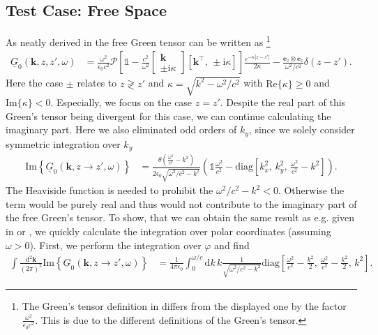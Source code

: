 \documentclass[11pt]{article}
\newcommand{\vv}[1]{\mathbf{#1}}
\newcommand{\ii}[0]{\mathrm{i}}
\newcommand{\dd}[0]{\mathrm{d}}
\begin{document}
\subsection{Test Case: Free Space}\label{sec:vacuum}
As neatly derived in \cite{amorim2017} the free Green tensor can be written as
\footnote{The Green's tensor definition in \cite{amorim2017} differs from the displayed one by the factor $\frac{\omega^2}{\epsilon_0c^2}$. This is due to the different definitions of the Green's tensor.}
\begin{align}
  \underline{G}_0(\vv k, z,z',\omega) &=
  \frac{\omega^2}{\epsilon_0c^2}
  \mathcal{P}\left[
    \mathbb{1}-\frac{c^2}{\omega^2}
    \begin{bmatrix}
      \vv k \\ \pm\ii \kappa
    \end{bmatrix}
    \left[ \vv k^\intercal ,\,\pm\ii\kappa\right]
  \right]
  \frac{e^{-\kappa|z-z'|}}{2\kappa}
  -\frac{\vv e_z\otimes\vv e_z}{\omega^2/c^2}\delta(z-z')
  .
\end{align}
Here the case $\pm$ relates to $z\gtrless z'$ and $\kappa=\sqrt{k^2-\omega^2/c^2}$ with $\mathrm{Re}\{\kappa\}\geq0$ and $\mathrm{Im}\{\kappa\}<0$. Especially, we focus on the case $z=z'$. Despite the real part of this Green's tensor being divergent for this case, we can continue calculating the imaginary part. Here we also eliminated odd orders of $k_y$, since we solely consider symmetric integration over $k_y$
%
\begin{align}
  \mathrm{Im}\left\{\underline{G}_0(\vv k, z\to z',\omega)\right\} &=
  \frac{
  \theta(\frac{\omega^2}{c^2}-k^2)
}{2\epsilon_0\sqrt{\omega^2/c^2-k^2}}
  \left(
    \mathbb{1}\frac{\omega^2}{c^2} -
    \mathrm{diag}\left[
      k_x^2,\,k_y^2,\,\frac{\omega^2}{c^2}-k^2
    \right]
  \right)
  .
\end{align}
The Heaviside function is needed to prohibit the $\omega^2/c^2 -k^2 <0$. Otherwise the term would be purely real and thus would not contribute to the imaginary part of the free Green's tensor. To show, that we can obtain the same result as e.g. given in \cite{buhmann2012b} or \cite{intravaia2016b}, we quickly calculate the integration over polar coordinates (assuming $\omega>0$). First, we perform the integration over $\varphi$ and find
%
\begin{align}
  \int \frac{\dd^2\vv k}{(2\pi)^2}
  \mathrm{Im}\left\{\underline{G}_0(\vv k, z\to z',\omega)\right\} &=
  \frac{1}{4\pi\epsilon_0}
  \int_0^{\omega/c} \dd k \,k
  \frac{1
}{\sqrt{\omega^2/c^2-k^2}}
    \mathrm{diag}\left[
     \frac{\omega^2}{c^2}-  \frac{k^2}{2},\,\frac{\omega^2}{c^2}-\frac{k^2}{2},\,k^2
    \right]
  .
\end{align}
\end{document}
